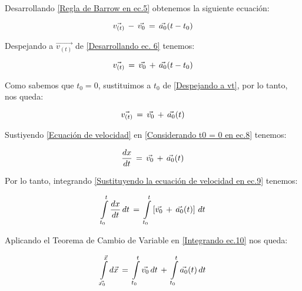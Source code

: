 \documentclass[letterpaper, 12pt]{article}
\begin{document}
\begin{enumerate}
    Desarrollando \ref{Regla de Barrow en ec.5} obtenemos la siguiente ecuación:
    
    \begin{equation}
        \label{Desarrollando ec. 6}
        \vec{v_{(t)}} \thinspace - \thinspace \vec{v_{0}} \thinspace = \thinspace \vec{a_{0}} (t-t_{0})
    \end{equation}
    
    Despejando a $\vec{v_{(t)}}$ de \ref{Desarrollando ec. 6} tenemos: 
    
    \begin{equation}
        \label{Despejando a vt}
        \vec{v_{(t)}} \thinspace = \thinspace \vec{v_{0}} \thinspace + \thinspace \vec{a_{0}} (t-t_{0})
    \end{equation}
    
    Como sabemos que $t_{0} = 0$, sustituimos a $t_{0}$ de \ref{Despejando a vt}, por lo tanto, nos queda:
    
    \begin{equation}
        \label{Considerando t0 = 0 en ec.8}
        \vec{v_{(t)}} \thinspace = \thinspace \vec{v_{0}} \thinspace + \thinspace \vec{a_{0}} (t)
    \end{equation}
    
    Sustiyendo \ref{Ecuación de velocidad} en \ref{Considerando t0 = 0 en ec.8} tenemos: 
    
    \begin{equation}
        \label{Sustituyendo la ecuación de velocidad en ec.9}
        \frac{dx}{dt} \thinspace = \thinspace \vec{v_{0}} \thinspace + \thinspace \vec{a_{0}} (t)
    \end{equation}
    
    Por lo tanto, integrando \ref{Sustituyendo la ecuación de velocidad en ec.9} tenemos:
    
    \begin{equation}
        \label{Integrando ec.10}
        \int\limits_{t_{0}}^{t} \frac{dx}{dt} \thinspace dt \thinspace = \thinspace \int\limits_{t_{0}}^{t} \left[ \vec{v_{0}} \thinspace + \thinspace \vec{a_{0}}(t)\right] \thinspace dt
    \end{equation}
    
    Aplicando el Teorema de Cambio de Variable en \ref{Integrando ec.10} nos queda:
    
    \begin{equation}
        \label{Aplicando el teorema de cambio de variable en ec.11}
        \int\limits_{\vec{x_{0}}}^{\vec{x}} d\vec{x} \thinspace = \thinspace \int\limits_{t_{0}}^{t} \vec{v_0} \thinspace dt \thinspace + \thinspace \int\limits_{t_{0}}^{t} \vec{a_{0}}(t) \thinspace dt
    \end{equation}
    

\end{enumerate}
\end{document}
